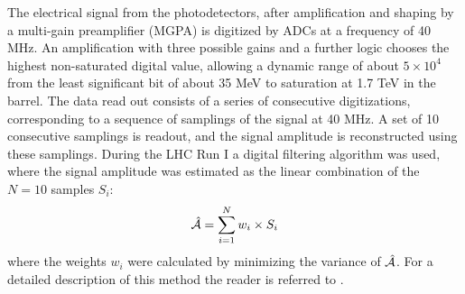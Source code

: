 \documentclass[journal]{IEEEtran}
\begin{document}
The electrical signal from the photodetectors, after amplification and shaping by a multi-gain preamplifier (MGPA) is digitized by ADCs at a frequency of 40 MHz. An amplification with three possible gains and a further logic chooses the highest non-saturated digital value, allowing a dynamic range of about $5 \times 10^4$ from the least significant bit of about 35 MeV to saturation at 1.7 TeV in the barrel.
The data read out consists of a series of consecutive digitizations, corresponding to a sequence of samplings of the signal at 40 MHz. A set of 10 consecutive samplings is readout, and the signal amplitude is reconstructed using these samplings. During the LHC Run I a digital filtering algorithm was used, where the signal amplitude was estimated as the linear combination of the $N=10$ samples $S_i$:
\begin{equation}
\hat{\cal A}=\sum_{i=1}^{N} w_i \times S_i
\end{equation}
where the weights $w_i$ were calculated by minimizing the variance of $\hat{\cal A}$. For a detailed description of this method the reader is referred to \cite{Bruneliere:2006ra}.
\end{document}
